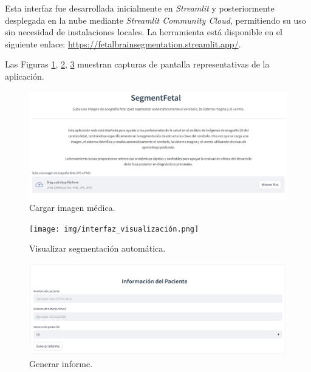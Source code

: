 Esta interfaz fue desarrollada inicialmente en \textit{Streamlit} y posteriormente desplegada en la nube mediante \textit{Streamlit Community Cloud}, permitiendo su uso sin necesidad de instalaciones locales. La herramienta está disponible en el siguiente enlace: \url{https://fetalbrainsegmentation.streamlit.app/}.

Las Figuras \ref{fig:subir_imagenG}, \ref{fig:visualizar_segmentaciónG}, \ref{fig:generar_informeG} muestran capturas de pantalla representativas de la aplicación.

\begin{figure}[h]
    \centering
    \includegraphics[width=1\textwidth]{img/interfaz_subir_imagen.png}
    \caption{Cargar imagen médica.}
    \label{fig:subir_imagenG}
\end{figure}

\begin{figure}[h]
    \centering
    \texttt{[image: img/interfaz\_visualización.png]}
    \caption{Visualizar segmentación automática.}
    \label{fig:visualizar_segmentaciónG}
\end{figure}

\begin{figure}[h]
    \centering
    \includegraphics[width=1\textwidth]{img/interfaz_generar_informe.png}
    \caption{Generar informe.}
    \label{fig:generar_informeG}
\end{figure}
